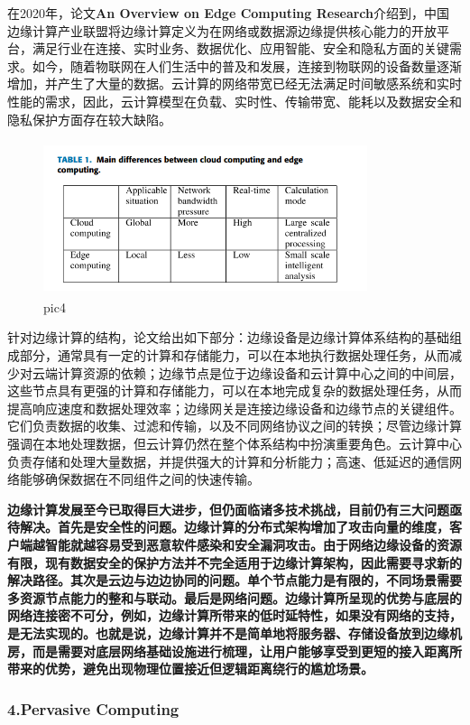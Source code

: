 \documentclass[a4paper,twoside]{scrbook}
\begin{document}
在2020年，论文\textbf{An Overview on Edge Computing Research}介绍到，中国边缘计算产业联盟将边缘计算定义为在网络或数据源边缘提供核心能力的开放平台，满足行业在连接、实时业务、数据优化、应用智能、安全和隐私方面的关键需求。如今，随着物联网在人们生活中的普及和发展，连接到物联网的设备数量逐渐增加，并产生了大量的数据。云计算的网络带宽已经无法满足时间敏感系统和实时性能的需求，因此，云计算模型在负载、实时性、传输带宽、能耗以及数据安全和隐私保护方面存在较大缺陷。
\begin{figure}
\centering %
\includegraphics[height=4.5cm,width=9.5cm]{edge1.png}
\caption{pic4}
\end{figure}
针对边缘计算的结构，论文给出如下部分：边缘设备是边缘计算体系结构的基础组成部分，通常具有一定的计算和存储能力，可以在本地执行数据处理任务，从而减少对云端计算资源的依赖；边缘节点是位于边缘设备和云计算中心之间的中间层，这些节点具有更强的计算和存储能力，可以在本地完成复杂的数据处理任务，从而提高响应速度和数据处理效率；边缘网关是连接边缘设备和边缘节点的关键组件。它们负责数据的收集、过滤和传输，以及不同网络协议之间的转换；尽管边缘计算强调在本地处理数据，但云计算仍然在整个体系结构中扮演重要角色。云计算中心负责存储和处理大量数据，并提供强大的计算和分析能力；高速、低延迟的通信网络能够确保数据在不同组件之间的快速传输。

\textbf{边缘计算发展至今已取得巨大进步，但仍面临诸多技术挑战，目前仍有三大问题亟待解决。首先是安全性的问题。边缘计算的分布式架构增加了攻击向量的维度，客户端越智能就越容易受到恶意软件感染和安全漏洞攻击。由于网络边缘设备的资源有限，现有数据安全的保护方法并不完全适用于边缘计算架构，因此需要寻求新的解决路径。其次是云边与边边协同的问题。单个节点能力是有限的，不同场景需要多资源节点能力的整和与联动。最后是网络问题。边缘计算所呈现的优势与底层的网络连接密不可分，例如，边缘计算所带来的低时延特性，如果没有网络的支持，是无法实现的。也就是说，边缘计算并不是简单地将服务器、存储设备放到边缘机房，而是需要对底层网络基础设施进行梳理，让用户能够享受到更短的接入距离所带来的优势，避免出现物理位置接近但逻辑距离绕行的尴尬场景。}

\subsubsection{4.Pervasive Computing}
\end{document}
